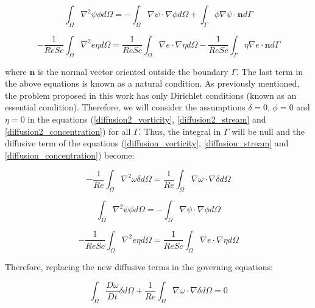 \begin{equation} \label{diffusion2_stream} 
 \int_{\Omega} \nabla^2 \psi \phi d\Omega
 = - \int_{\Omega} \nabla \psi \cdot \nabla \phi d\Omega
   + \int_{\Gamma} \phi \nabla \psi \cdot \textbf{n} d\Gamma
\end{equation}

\begin{equation} \label{diffusion2_concentration} 
 - \frac{1}{\textit{ReSc}} \int_{\Omega} \nabla^2 e \eta d\Omega
 = \frac{1}{\textit{ReSc}} \int_{\Omega} \nabla e \cdot \nabla \eta d\Omega
 - \frac{1}{\textit{ReSc}} \int_{\Gamma} \eta \nabla e \cdot \textbf{n} d\Gamma
\end{equation}

\noindent
where \textbf{n} is the normal vector oriented outside the boundary $\Gamma$. 
The last term in the above equations is known as a natural condition. 
As previously mentioned, 
the problem proposed in this work has only Dirichlet conditions 
(known as an essential condition).
Therefore,
we will consider the assumptions
$\delta = 0$, $\phi = 0$ and $\eta = 0$ in the equations (\ref{diffusion2_vorticity}, \ref{diffusion2_stream} and \ref{diffusion2_concentration})
for all $\Gamma$. 
Thus, 
the integral in $\Gamma$ will be null
and the diffusive term of the equations 
(\ref{diffusion_vorticity}, \ref{diffusion_stream} and \ref{diffusion_concentration}) become:

\begin{equation}
 - \frac{1}{\textit{Re}} \int_{\Omega} \nabla^2 \omega \delta d\Omega
 = \frac{1}{\textit{Re}} \int_{\Omega} \nabla \omega \cdot \nabla \delta d\Omega
\end{equation}

\begin{equation} 
 \int_{\Omega} \nabla^2 \psi \phi d\Omega
 = - \int_{\Omega} \nabla \psi \cdot \nabla \phi d\Omega
\end{equation}

\begin{equation} 
 - \frac{1}{\textit{ReSc}} \int_{\Omega} \nabla^2 e \eta d\Omega
 = \frac{1}{\textit{ReSc}} \int_{\Omega} \nabla e \cdot \nabla \eta d\Omega
\end{equation}

\medskip
\noindent
Therefore, replacing the new diffusive terms in the governing equations:

\begin{equation} \label{vorticity weak} 
   \int_{\Omega} \frac{D \omega}{Dt} \delta d\Omega 
 + \frac{1}{\textit{Re}} \int_{\Omega} \nabla \omega \cdot \nabla \delta d\Omega 
 = 0
\end{equation}

